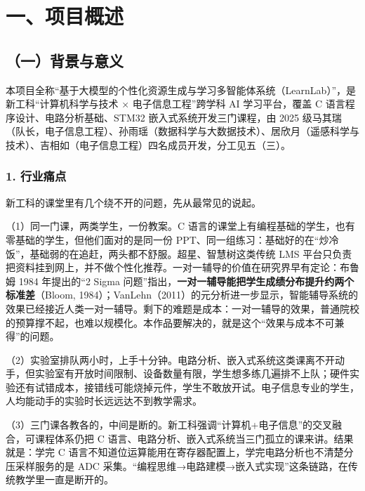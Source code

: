 \documentclass[zihao=-4,a4paper,UTF8,fontset=windows]{ctexart}
\begin{document}
\section{一、项目概述}
\subsection{（一）背景与意义}


本项目全称“基于大模型的个性化资源生成与学习多智能体系统（LearnLab）”，是新工科“计算机科学与技术 × 电子信息工程”跨学科 AI 学习平台，覆盖 C 语言程序设计、电路分析基础、STM32 嵌入式系统开发三门课程，由 2025 级马其瑞（队长，电子信息工程）、孙雨瑶（数据科学与大数据技术）、居欣月（遥感科学与技术）、吉相如（电子信息工程）四名成员开发，分工见五（三）。

\subsubsection{1. 行业痛点}


新工科的课堂里有几个绕不开的问题，先从最常见的说起。



（1）同一门课，两类学生，一份教案。C 语言的课堂上有编程基础的学生，也有零基础的学生，但他们面对的是同一份 PPT、同一组练习：基础好的在“炒冷饭”，基础弱的在追赶，两头都不舒服。超星、智慧树这类传统 LMS 平台只负责把资料挂到网上，并不做个性化推荐。一对一辅导的价值在研究界早有定论：布鲁姆 1984 年提出的“2 Sigma 问题”指出，\textbf{一对一辅导能把学生成绩分布提升约两个标准差}（Bloom, 1984）；VanLehn（2011）的元分析进一步显示，智能辅导系统的效果已经接近人类一对一辅导。剩下的难题是成本：一对一辅导的效果，普通院校的预算撑不起，也难以规模化。本作品要解决的，就是这个“效果与成本不可兼得”的问题。



（2）实验室排队两小时，上手十分钟。电路分析、嵌入式系统这类课离不开动手，但实验室有开放时间限制、设备数量有限，学生想多练几遍排不上队；硬件实验还有试错成本，接错线可能烧掉元件，学生不敢放开试。电子信息专业的学生，人均能动手的实验时长远远达不到教学需求。



（3）三门课各教各的，中间是断的。新工科强调“计算机+电子信息”的交叉融合，可课程体系仍把 C 语言、电路分析、嵌入式系统当三门孤立的课来讲。结果就是：学完 C 语言不知道位运算能用在寄存器配置上，学完电路分析也不清楚分压采样服务的是 ADC 采集。“编程思维→电路建模→嵌入式实现”这条链路，在传统教学里一直是断开的。
\end{document}
